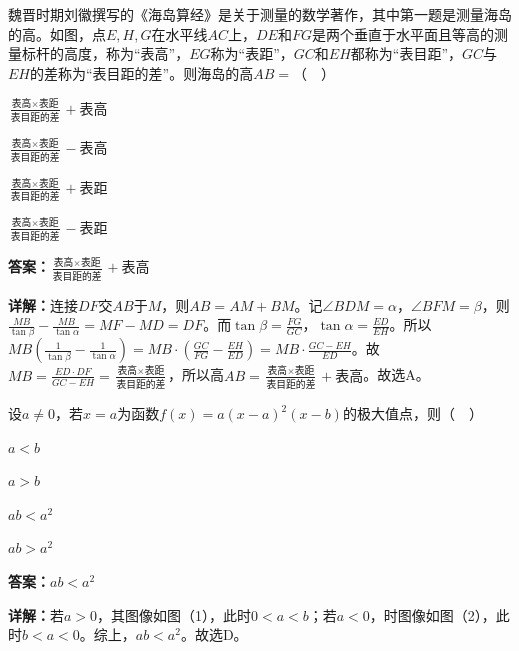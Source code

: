 \begin{question}[points=5]
魏晋时期刘徽撰写的《海岛算经》是关于测量的数学著作，其中第一题是测量海岛的高。如图，点$E,H,G$在水平线$AC$上，$DE$和$FG$是两个垂直于水平面且等高的测量标杆的高度，称为“表高”，$EG$称为“表距”，$GC$和$EH$都称为“表目距”，$GC$与$EH$的差称为“表目距的差”。则海岛的高$AB=$（  ）
\begin{choices}
  \item $\frac{\text{表高}\times\text{表距}}{\text{表目距的差}}+\text{表高}$
  \item $\frac{\text{表高}\times\text{表距}}{\text{表目距的差}}-\text{表高}$
  \item $\frac{\text{表高}\times\text{表距}}{\text{表目距的差}}+\text{表距}$
  \item $\frac{\text{表高}\times\text{表距}}{\text{表目距的差}}-\text{表距}$
\end{choices}
\begin{solution}
\textbf{答案：}$\frac{\text{表高}\times\text{表距}}{\text{表目距的差}}+\text{表高}$

\textbf{详解：}连接$DF$交$AB$于$M$，则$AB=AM+BM$。记$\angle BDM=\alpha$，$\angle BFM=\beta$，则$\frac{MB}{\tan\beta}-\frac{MB}{\tan\alpha}=MF-MD=DF$。而$\tan\beta=\frac{FG}{GC}$，$\tan\alpha=\frac{ED}{EH}$。所以$MB\left(\frac{1}{\tan\beta}-\frac{1}{\tan\alpha}\right)=MB\cdot\left(\frac{GC}{FG}-\frac{EH}{ED}\right)=MB\cdot\frac{GC-EH}{ED}$。故$MB=\frac{ED\cdot DF}{GC-EH}=\frac{\text{表高}\times\text{表距}}{\text{表目距的差}}$，所以高$AB=\frac{\text{表高}\times\text{表距}}{\text{表目距的差}}+\text{表高}$。故选A。
\end{solution}
\end{question}

\begin{question}[points=5]
设$a\neq0$，若$x=a$为函数$f(x)=a(x-a)^2(x-b)$的极大值点，则（  ）
\begin{choices}
  \item $a<b$
  \item $a>b$
  \item $ab<a^2$
  \item $ab>a^2$
\end{choices}
\begin{solution}
\textbf{答案：}$ab<a^2$

\textbf{详解：}若$a>0$，其图像如图（1），此时$0<a<b$；若$a<0$，时图像如图（2），此时$b<a<0$。综上，$ab<a^2$。故选D。
\end{solution}
\end{question}

